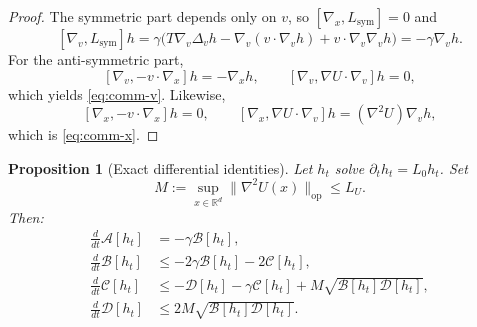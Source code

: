\documentclass[11pt]{article}
\newtheorem{proposition}[theorem]{Proposition}
\theoremstyle{definition}
\theoremstyle{remark}
\newcommand{\R}{\mathbb{R}}
\begin{document}
\begin{proof}
The symmetric part depends only on $v$, so $[\nabla_x,L_{\mathrm{sym}}]=0$ and
\[
[\nabla_v,L_{\mathrm{sym}}]h
=
\gamma\bigl(T\nabla_v\Delta_v h-\nabla_v(v\cdot \nabla_v h)+v\cdot \nabla_v\nabla_v h\bigr)
=
-\gamma \nabla_v h.
\]
For the anti-symmetric part,
\[
[\nabla_v,-v\cdot \nabla_x]h=-\nabla_x h,
\qquad
[\nabla_v,\nabla U\cdot \nabla_v]h=0,
\]
which yields \eqref{eq:comm-v}. Likewise,
\[
[\nabla_x,-v\cdot \nabla_x]h=0,
\qquad
[\nabla_x,\nabla U\cdot \nabla_v]h=(\nabla^2 U)\nabla_v h,
\]
which is \eqref{eq:comm-x}.
\end{proof}

\begin{proposition}[Exact differential identities]\label{prop:abcd}
Let $h_t$ solve $\partial_t h_t=L_0 h_t$. Set
\[
M:=\sup_{x\in \R^d}\|\nabla^2 U(x)\|_{\mathrm{op}}\leq L_U.
\]
Then:
\begin{align}
\frac{d}{dt}\mathcal A[h_t]
&=
-\gamma \mathcal B[h_t],
\label{eq:A-ode}\\
\frac{d}{dt}\mathcal B[h_t]
&\leq
-2\gamma \mathcal B[h_t]-2\mathcal C[h_t],
\label{eq:B-ode}\\
\frac{d}{dt}\mathcal C[h_t]
&\leq
-\mathcal D[h_t]-\gamma \mathcal C[h_t]
+M\sqrt{\mathcal B[h_t]\mathcal D[h_t]},
\label{eq:C-ode}\\
\frac{d}{dt}\mathcal D[h_t]
&\leq
2M\sqrt{\mathcal B[h_t]\mathcal D[h_t]}.
\label{eq:D-ode}
\end{align}
\end{proposition}
\end{document}

